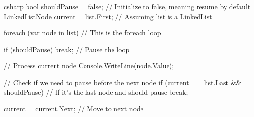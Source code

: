csharp
bool shouldPause = false; // Initialize to false, meaning resume by default
LinkedListNode current = list.First; // Assuming list is a LinkedList

foreach (var node in list) // This is the foreach loop
{
    if (shouldPause)
    {
        break; // Pause the loop
    }
    
    // Process current node
    Console.WriteLine(node.Value);
    
    // Check if we need to pause before the next node
    if (current == list.Last && shouldPause) // If it's the last node and should pause
    {
        break;
    }
    
    current = current.Next; // Move to next node
}